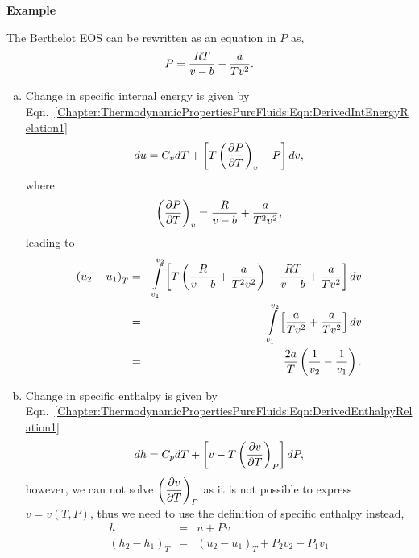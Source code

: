 \begin{MyExample}{\begin{center}{\bf Example}\end{center}}
        The Berthelot EOS can be rewritten as an equation in $P$ as,
           \begin{displaymath}
              P = \frc{RT}{v-b} - \frc{a}{Tv^{2}}.
           \end{displaymath}
         \begin{enumerate}[a)]
            \item Change in specific internal energy is given by Eqn.~\ref{Chapter:ThermodynamicPropertiesPureFluids:Eqn:DerivedIntEnergyRelation1}
                \begin{displaymath}
                     du = C_{v}dT + \left[T\Partial[P]{T}{v}-P\right]dv,
                \end{displaymath}
                where
                \begin{displaymath}
                     \Partial[P]{T}{v} = \frc{R}{v-b} + \frc{a}{T^{2}v^{2}},
                \end{displaymath}
                leading to
                \begin{eqnarray}
                    \left(u_{2}-u_{1}\right)_{T} &=& \int\limits_{v_{1}}^{v_{2}}\left[T \left(\frc{R}{v-b} + \frc{a}{T^{2}v^{2}}\right) - \frc{RT}{v-b} + \frc{a}{Tv^{2}}\right] dv \nonumber \\
                                               &=& \int\limits_{v_{1}}^{v_{2}}\left[\frc{a}{Tv^{2}} + \frc{a}{Tv^{2}}\right] dv \nonumber \\
                                               &=& \frc{2a}{T}\left(\frc{1}{v_{2}}-\frc{1}{v_{1}}\right). \nonumber
                \end{eqnarray}
            \item Change in specific enthalpy is given by Eqn.~\ref{Chapter:ThermodynamicPropertiesPureFluids:Eqn:DerivedEnthalpyRelation1}
                \begin{displaymath}
                     dh = C_{p}dT + \left[v - T\Partial[v]{T}{P}\right]dP,
                \end{displaymath}
                however, we can not solve $\Partial[v]{T}{P}$ as it is not possible to express $v=v(T,P)$, thus we need to use the definition of specific enthalpy instead,
                \begin{eqnarray}
                                          h &=& u + Pv \nonumber \\
                 \left(h_{2}-h_{1}\right)_{T} &=& \left(u_{2}-u_{1}\right)_{T} + P_{2}v_{2} - P_{1}v_{1} \nonumber \\

\end{eqnarray}
\end{enumerate}
\end{MyExample}

